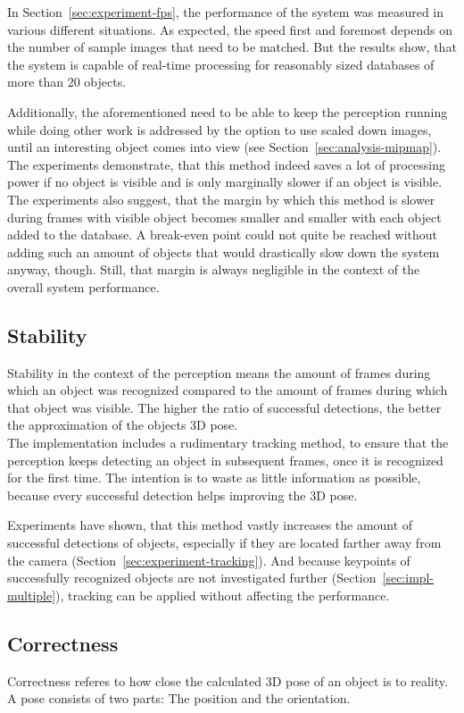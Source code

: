 In Section~\ref{sec:experiment-fps}, the performance of the system was measured in various different situations. As expected, the speed first and foremost depends on the number of sample images that need to be matched. But the results show, that the system is capable of real-time processing for reasonably sized databases of more than 20 objects.

Additionally, the aforementioned need to be able to keep the perception running while doing other work is addressed by the option to use scaled down images, until an interesting object comes into view (see Section~\ref{sec:analysis-mipmap}). The experiments demonstrate, that this method indeed saves a lot of processing power if no object is visible and is only marginally slower if an object is visible. The experiments also suggest, that the margin by which this method is slower during frames with visible object becomes smaller and smaller with each object added to the database. A break-even point could not quite be reached without adding such an amount of objects that would drastically slow down the system anyway, though. Still, that margin is always negligible in the context of the overall system performance.

\subsection*{Stability}
\label{sec:eval-stability}
Stability in the context of the perception means the amount of frames during which an object was recognized compared to the amount of frames during which that object was visible. The higher the ratio of successful detections, the better the approximation of the objects 3D pose. \\

The implementation includes a rudimentary tracking method, to ensure that the perception keeps detecting an object in subsequent frames, once it is recognized for the first time. The intention is to waste as little information as possible, because every successful detection helps improving the 3D pose.

Experiments have shown, that this method vastly increases the amount of successful detections of objects, especially if they are located farther away from the camera (Section~\ref{sec:experiment-tracking}). And because keypoints of successfully recognized objects are not investigated further (Section~\ref{sec:impl-multiple}), tracking can be applied without affecting the performance.

\subsection*{Correctness}
\label{sec:eval-correctness}
Correctness referes to how close the calculated 3D pose of an object is to reality. A pose consists of two parts: The position and the orientation.

